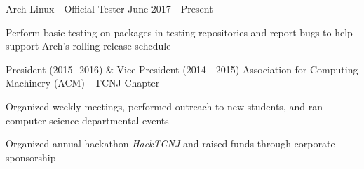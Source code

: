 
%
%

\begin{cventries}

  \bproject
    {Arch Linux - Official Tester}
    {June 2017 - Present} %
    {
      \begin{cvitems} %
        \item {Perform basic testing on packages in testing repositories and report bugs to help support Arch's rolling release schedule}
      \end{cvitems}
    }

  \cventry
  {President (2015 -2016) \& Vice President (2014 - 2015)} %
  {Association for Computing Machinery (ACM) - TCNJ Chapter} %
  {} %
  {} %
  {
    \begin{cvitems} %
    \item {Organized weekly meetings, performed outreach to new students, and ran computer science departmental events}
    \item {Organized annual hackathon \emph{HackTCNJ} and raised funds through corporate sponsorship}
    \end{cvitems}
  }

\end{cventries}
